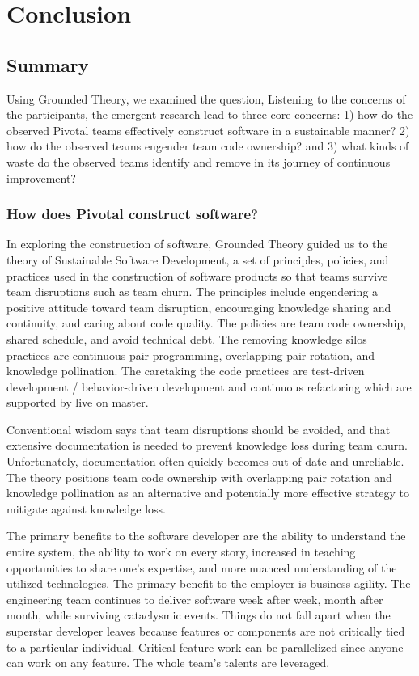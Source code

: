 
\chapter{Conclusion}
\label{ConclusionChapter}
\section{Summary}
Using Grounded Theory, we examined the question,  Listening to the concerns of the participants, the emergent research lead to three core concerns: 1) how do the observed Pivotal teams effectively construct software in a sustainable manner? 2) how do the observed teams engender team code ownership? and 3) what kinds of waste do the observed teams identify and remove in its journey of continuous improvement? 

\subsection{How does Pivotal construct software?}
In exploring the construction of software, Grounded Theory guided us to the theory of Sustainable Software Development, a set of principles, policies, and practices used in the construction of software products so that teams survive team disruptions such as team churn. The principles include engendering a positive attitude toward team disruption, encouraging knowledge sharing and continuity, and caring about code quality. The policies are team code ownership, shared schedule, and avoid technical debt. The removing knowledge silos practices are continuous pair programming, overlapping pair rotation, and knowledge pollination. The caretaking the code practices are test-driven development / behavior-driven development and continuous refactoring which are supported by live on master.

Conventional wisdom says that team disruptions should be avoided, and that extensive documentation is needed to prevent knowledge loss during team churn. Unfortunately, documentation often quickly becomes out-of-date and unreliable. The theory positions team code ownership with overlapping pair rotation and knowledge pollination as an alternative and potentially more effective strategy to mitigate against knowledge loss.

The primary benefits to the software developer are the ability to understand the entire system, the ability to work on every story, increased in teaching opportunities to share one's expertise, and more nuanced understanding of the utilized technologies.
The primary benefit to the employer is business agility. The engineering team continues to deliver software week after week, month after month, while surviving cataclysmic events. Things do not fall apart when the superstar developer leaves because features or components are not critically tied to a particular individual. Critical feature work can be parallelized since anyone can work on any feature. The whole team's talents are leveraged.


